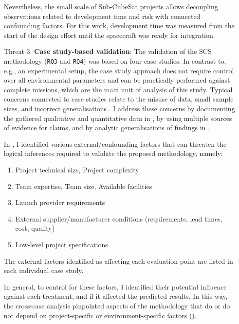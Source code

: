 \documentclass[a4paper,nobib,justified,final]{tufte-book}
\begin{document}
\begin{fullwidth}
\begin{enumerate}
	Nevertheless, the small scale of Sub-CubeSat projects allows decoupling observations related to development time and risk with connected confounding factors. For this work, development time was measured from the start of the design effort until the spacecraft was ready for integration.

	\item[Threat 3.] \textbf{Case study-based validation}: The validation of the \acs{SCS} methodology (\texttt{RQ3} and \texttt{RQ4}) was based on four case studies. In contrast to, e.g.\@, an experimental setup, the case study approach does not require control over all environmental parameters and can be practically performed against complete missions, which are the main unit of analysis of this study. Typical concerns connected to case studies relate to the misuse of data, small sample sizes, and incorrect generalisations \cite[266]{yinCaseStudyResearch2014}. I address these concerns by documenting the gathered qualitative and quantitative data in , by using multiple sources of evidence for claims, and by analytic generalisations of findings in .
	
	In , I identified various external/confounding factors that can threaten the logical inferences required to validate the proposed methodology, namely:
	\begin{enumerate}[itemsep=-2ex]
		\item Project technical size, Project complexity
		\item Team expertise, Team size, Available facilities
		\item Launch provider requirements
		\item External supplier/manufacturer conditions (requirements, lead times, cost, quality)
		\item Low-level project specifications
	\end{enumerate}
	The external factors identified as affecting each evaluation point are listed in each individual case study.

	In general, to control for these factors, 
	I identified their potential influence against each treatment, and if it affected the predicted results. In this way, the cross-case analysis pinpointed aspects of the methodology that do or do not depend on project-specific or environment-specific factors ().


\end{enumerate}
\end{fullwidth}
\end{document}
